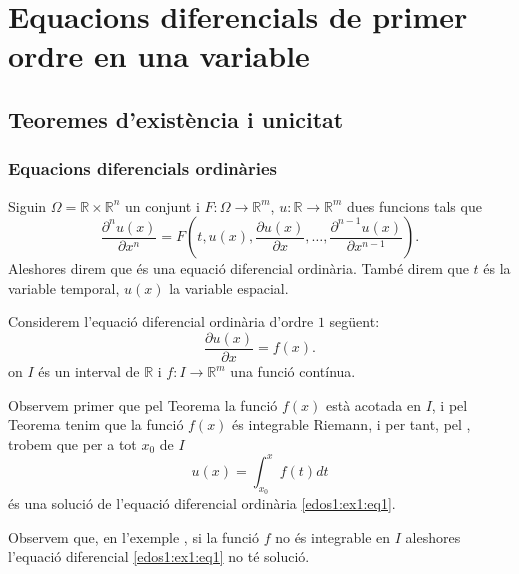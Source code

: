 \documentclass[../Apunts.tex]{subfiles}
\begin{document}
\chapter{Equacions diferencials de primer ordre en una variable}
	\section{Teoremes d'existència i unicitat}
	\subsection{Equacions diferencials ordinàries}
	\begin{definition}
		\label{def:equació diferencial ordinària d'ordre n}
		\label{def:solució de l'equació diferencial ordinària}
		Siguin \(\Omega=\mathbb{R}\times\mathbb{R}^{n}\) un conjunt i \(F\colon\Omega\longrightarrow\mathbb{R}^{m}\), \(u\colon\mathbb{R}\longrightarrow\mathbb{R}^{m}\) dues funcions tals que
		\[\frac{\partial^{n}u(x)}{\partial x^{n}}=F\left(t,u(x),\frac{\partial u(x)}{\partial x},\dots,\frac{\partial^{n-1}u(x)}{\partial x^{n-1}}\right).\]
		Aleshores direm que
		és una equació diferencial ordinària. També direm que \(t\) és la variable temporal, \(u(x)\) la variable espacial.
	\end{definition}
	\begin{example}
		\label{ex:edos1:1}
		Considerem l'equació diferencial ordinària d'ordre \(1\) següent:
		\begin{equation}
			\label{edos1:ex1:eq1}
			\frac{\partial u(x)}{\partial x}=f(x).
		\end{equation}
		on \(I\) és un interval de \(\mathbb{R}\) i \(f\colon I\longrightarrow\mathbb{R}^{m}\) una funció contínua.
		\begin{solution}
			Observem primer que pel Teorema  la funció \(f(x)\) està acotada en \(I\), i pel Teorema  tenim que la funció \(f(x)\) és integrable Riemann, i per tant, pel , trobem que per a tot \(x_{0}\) de \(I\)
			\[u(x)=\int_{x_{0}}^{x}f(t)dt\]
			és una solució de l'equació diferencial ordinària \eqref{edos1:ex1:eq1}.
		\end{solution}
	\end{example}
	\begin{observation}
		Observem que, en l'exemple , si la funció \(f\) no és integrable en \(I\) aleshores l'equació diferencial \eqref{edos1:ex1:eq1} no té solució. %
	\end{observation}
\end{document}

